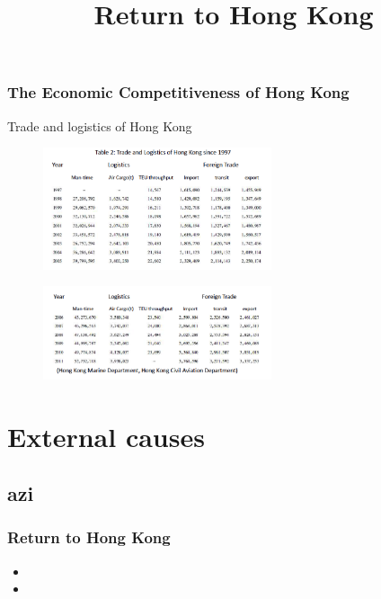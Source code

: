 \documentclass[slidestop,uncompress,mathsans, 12pt]{beamer}
\begin{document}
\begin{frame}
\frametitle{The Economic Competitiveness of Hong Kong}
Trade and logistics of Hong Kong\\
\begin{figure}[h]
\includegraphics[width=0.6\textwidth]{hk13.png}
\label{threadsVsSync}
\end{figure}
\begin{figure}[h]
\includegraphics[width=0.6\textwidth]{hk14.png}
\label{threadsVsSync}
\end{figure}
\end{frame}
\section{External causes}
\subsection{azi}
\begin{frame}
\title{Return to Hong Kong}
\date{}
\titlepage
\end{frame}
\begin{frame}
\frametitle{Return to Hong Kong}
\begin{itemize}
\item<2-> 
\bigskip
\item<2-> 
\end{itemize}
\end{frame}
\end{document}
